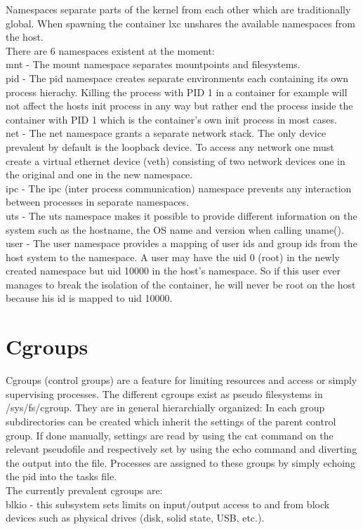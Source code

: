 Namespaces separate parts of the kernel from each other which are traditionally global. When spawning the container lxc unshares
the available namespaces from the host.\\
There are 6 namespaces existent at the moment:\\
mnt - The mount namespace separates mountpoints and filesystems.\\
pid - The pid namespace creates separate environments each containing its own process hierachy. Killing the process with PID 1
in a container for example will not affect the hosts init process in any way but rather end the process inside the container with PID 1
which is the container's own init process in most cases.\\
net - The net namespace grants a separate network stack. The only device prevalent by default is the loopback device. To access any network
one must create a virtual ethernet device (veth) consisting of two network devices one in the original and one in the new namespace.\\
ipc - The ipc (inter process communication) namespace prevents any interaction between processes in separate namespaces.\\
uts - The uts namespace makes it possible to provide different information on the system such as the hostname, the OS name and version
when calling uname().\\
user - The user namespace provides a mapping of user ids and group ids from the host system to the namespace. A user may have the uid 0
(root) in the newly created namespace but uid 10000 in the host's namespace. So if this user ever manages to break the isolation of the
container, he will never be root on the host because his id is mapped to uid 10000.\\

\section{Cgroups}

Cgroups (control groups) are a feature for limiting resources and access or simply supervising processes. The different cgroups exist as
pseudo filesystems in /sys/fs/cgroup. They are in general hierarchially organized: In each group subdirectories can be created
which inherit the settings of the parent control group. If done manually, settings are read by using the cat command on the relevant
pseudofile and respectively set by using the echo command and diverting the output into the file. Processes are assigned to these groups
by simply echoing the pid into the tasks file.\\
The currently prevalent cgroups are:\\
blkio - this subsystem sets limits on input/output access to and from block devices such as physical drives (disk, solid state, USB, etc.). 


